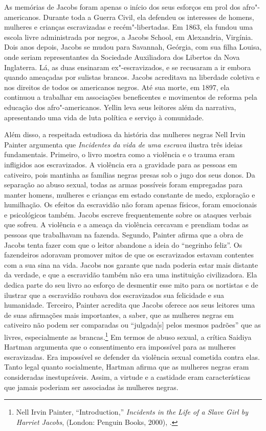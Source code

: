 As memórias de Jacobs foram apenas o início dos seus esforços em prol
dos afro"-americanos. Durante toda a Guerra Civil, ela defendeu os
interesses de homens, mulheres e crianças escravizadas e
recém"-libertadas. Em 1863, ela fundou uma escola livre administrada por
negros, a Jacobs School, em Alexandria, Virgínia. Dois anos depois,
Jacobs se mudou para Savannah, Geórgia, com sua filha Louisa, onde
seriam representantes da Sociedade Auxiliadora dos Libertos da Nova
Inglaterra. Lá, as duas ensinaram ex"-escravizados, e se recusaram a ir
embora quando ameaçadas por sulistas brancos. Jacobs acreditava na
liberdade coletiva e nos direitos de todos os americanos negros. Até sua
morte, em 1897, ela continuou a trabalhar em associações beneficentes e
movimentos de reforma pela educação dos afro"-americanos. Yellin leva
seus leitores além da narrativa, apresentando uma vida de luta política e
serviço à comunidade.

Além disso, a respeitada estudiosa da história das mulheres negras Nell
Irvin Painter argumenta que \emph{Incidentes da vida de uma escrava}
ilustra três ideias fundamentais. Primeiro, o livro mostra como a
violência e o trauma eram infligidos aos escravizados. A violência era a
gravidade para as pessoas em cativeiro, pois
mantinha as famílias negras presas sob o jugo dos seus donos. Da
separação ao abuso sexual, todas as armas possíveis foram empregadas
para manter homens, mulheres e crianças em estado constante de medo,
exploração e humilhação. Os efeitos da escravidão não foram apenas
físicos, foram emocionais e psicológicos também. Jacobs escreve
frequentemente sobre os ataques verbais que sofreu. A violência e a
ameaça da violência cercavam e prendiam todas as pessoas que trabalhavam
na fazenda. Segundo, Painter afirma que a obra de Jacobs tenta fazer com
que o leitor abandone a ideia do ``negrinho feliz''. Os fazendeiros
adoravam promover mitos de que os escravizados estavam contentes com a
sua sina na vida. Jacobs nos garante que nada poderia estar mais
distante da verdade, e que a escravidão também não era uma instituição
civilizadora. Ela dedica parte do seu livro ao esforço de desmentir esse
mito para os nortistas e de ilustrar que a escravidão roubava dos
escravizados sua felicidade e sua humanidade. Terceiro, Painter acredita
que Jacobs oferece aos seus leitores uma de suas afirmações mais
importantes, a saber, que as mulheres negras em cativeiro não podem ser
comparadas ou ``julgada{[}s{]} pelos mesmos padrões'' que as livres,
especialmente as brancas.\footnote{Nell Irvin Painter, ``Introduction,''
  \emph{Incidents in the Life of a Slave Girl by Harriet Jacobs},
  (London: Penguin Books, 2000), .} Em termos de abuso sexual, a
crítica Saidiya Hartman argumenta que o consentimento era impossível
para as mulheres escravizadas. Era impossível se defender da violência
sexual cometida contra elas. Tanto legal quanto socialmente, Hartman
afirma que as mulheres negras eram consideradas inestupráveis. Assim, a
virtude e a castidade eram características que jamais poderiam ser
associadas às mulheres negras.

